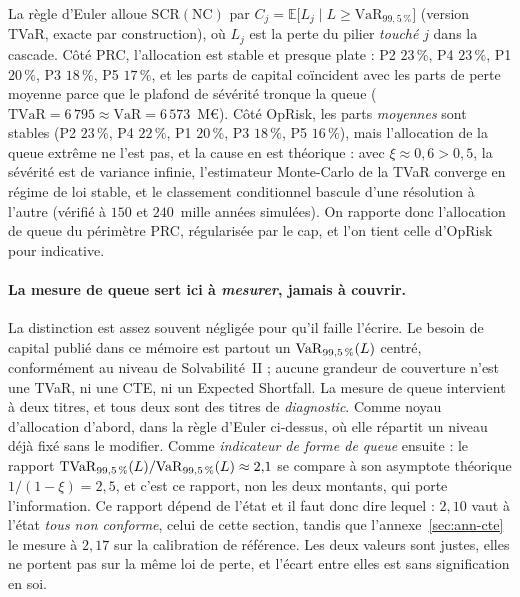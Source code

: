 La règle d'Euler alloue $\mathrm{SCR}(\text{NC})$ par
$C_j = \mathbb{E}\bigl[L_j \mid L \ge \mathrm{VaR}_{99{,}5\,\%}\bigr]$ (version TVaR, exacte
par construction), où $L_j$ est la perte du pilier \emph{touché} $j$ dans la cascade. Côté
PRC, l'allocation est stable et presque plate : P2 $23\,\%$, P4 $23\,\%$, P1 $20\,\%$,
P3 $18\,\%$, P5 $17\,\%$, et les parts de capital coïncident avec les parts de perte moyenne
parce que le plafond de sévérité tronque la queue
($\mathrm{TVaR} = 6\,795 \approx \mathrm{VaR} = 6\,573$~M\euro). Côté OpRisk, les parts
\emph{moyennes} sont stables (P2 $23\,\%$, P4 $22\,\%$, P1 $20\,\%$, P3 $18\,\%$,
P5 $16\,\%$), mais l'allocation de la queue extrême ne l'est pas, et la cause en est
théorique : avec $\xi \approx 0{,}6 > 0{,}5$, la sévérité est de variance infinie,
l'estimateur Monte-Carlo de la TVaR converge en régime de loi stable, et le classement
conditionnel bascule d'une résolution à l'autre (vérifié à $150$ et $240$~mille années
simulées). On rapporte donc l'allocation de queue du périmètre PRC, régularisée par le cap,
et l'on tient celle d'OpRisk pour indicative.

\paragraph{La mesure de queue sert ici à \emph{mesurer}, jamais à couvrir.} La distinction est
assez souvent négligée pour qu'il faille l'écrire. Le besoin de capital publié dans ce mémoire
est partout un $\mathrm{VaR}_{99{,}5\,\%}(L)$ centré, conformément au niveau de Solvabilité~II ; aucune
grandeur de couverture n'est une TVaR, ni une CTE, ni un Expected Shortfall. La mesure
de queue intervient à deux titres, et tous deux sont des titres de \emph{diagnostic}. Comme
noyau d'allocation d'abord, dans la règle d'Euler ci-dessus, où elle répartit un niveau déjà
fixé sans le modifier. Comme \emph{indicateur de forme de queue} ensuite : le rapport
$\mathrm{TVaR}_{99{,}5\,\%}(L)/\mathrm{VaR}_{99{,}5\,\%}(L) \approx 2{,}1$ se compare à son asymptote théorique
$1/(1-\xi) = 2{,}5$, et c'est ce rapport, non les deux montants, qui porte l'information.
Ce rapport dépend de l'état et il faut
donc dire lequel : $2{,}10$ vaut à l'état \emph{tous non conforme}, celui de cette section, tandis
que l'annexe~\ref{sec:ann-cte} le mesure à $2{,}17$ sur la calibration de référence. Les deux
valeurs sont justes, elles ne portent pas sur la même loi de perte, et l'écart entre elles est
sans signification en soi.

